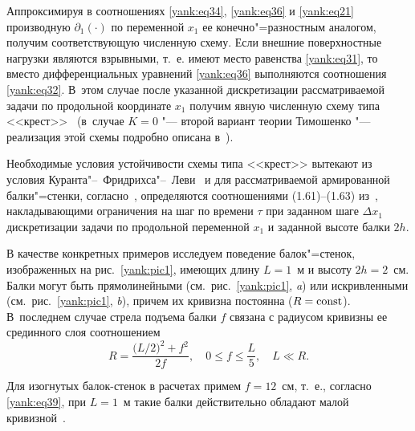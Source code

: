 Аппроксимируя в соотношениях \eqref{yank:eq34}, \eqref{yank:eq36} и \eqref{yank:eq21} производную $\partial _1
(\cdot)$ по переменной $x_1$ ее конечно"=разностным аналогом,
получим соответствующую численную схему. 
Если внешние поверхностные нагрузки являются взрывными, т.~е. имеют место равенства \eqref{yank:eq31}, то вместо
дифференциальных уравнений \eqref{yank:eq36} выполняются соотношения \eqref{yank:eq32}. 
В~этом случае после указанной дискретизации рассматриваемой задачи по продольной координате $x_1$ получим явную численную схему типа <<крест>>~\cite{yank:bib11,yank:bib12} (в~случае $K=0$ "--- второй вариант теории Тимошенко "--- реализация этой схемы подробно описана в~\cite{yank:bib13}).

Необходимые условия устойчивости схемы типа <<крест>> вытекают из условия
Куранта"--~Фридрихса"--~Леви~\cite{yank:bib22} и для рассматриваемой армированной
балки"=стенки, согласно~\cite{yank:bib11,yank:bib12}, определяются соотношениями (1.61)--(1.63)
из~\cite{yank:bib13}, накладывающими ограничения на шаг по времени $\tau $ при заданном
шаге $\Delta x_1$ дискретизации задачи по продольной переменной $x_1$ и
заданной высоте балки $2h$.

\smallskip

 В качестве конкретных примеров
исследуем поведение балок"=стенок, изображенных на рис.~\ref{yank:pic1}, имеющих длину
$L=1$~м и высоту $2h=2$~см. Балки могут быть
прямолинейными (см.~рис.~\ref{yank:pic1}, {\sl a}) или искривленными (см.~рис.~\ref{yank:pic1}, {\sl b}), причем их
кривизна постоянна ($R={\rm const}$). 
В~последнем случае стрела подъема балки $f$ связана с радиусом кривизны ее срединного слоя соотношением
\begin{equation}
\label{yank:eq39}
R=\frac{\big(L/2\big)^2+f^2}{2f},\quad 0\le f\le \frac{L}{5},\quad  L \ll R.
\end{equation}

Для изогнутых балок-стенок в расчетах примем $f=12$~см, т.~е.,
согласно \eqref{yank:eq39}, при $L=1$~м такие балки действительно обладают малой кривизной~\cite{yank:bib17}.

